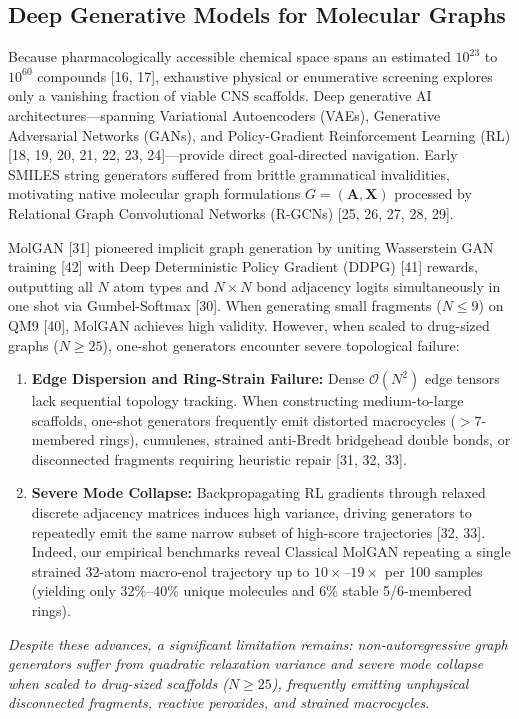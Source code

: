 \documentclass[10pt,a4paper]{article}
\begin{document}
\subsection{Deep Generative Models for Molecular Graphs}
Because pharmacologically accessible chemical space spans an estimated $10^{23}$ to $10^{60}$ compounds [16, 17], exhaustive physical or enumerative screening explores only a vanishing fraction of viable CNS scaffolds. Deep generative AI architectures---spanning Variational Autoencoders (VAEs), Generative Adversarial Networks (GANs), and Policy-Gradient Reinforcement Learning (RL) [18, 19, 20, 21, 22, 23, 24]---provide direct goal-directed navigation. Early SMILES string generators suffered from brittle grammatical invalidities, motivating native molecular graph formulations $G = (\mathbf{A}, \mathbf{X})$ processed by Relational Graph Convolutional Networks (R-GCNs) [25, 26, 27, 28, 29].

MolGAN [31] pioneered implicit graph generation by uniting Wasserstein GAN training [42] with Deep Deterministic Policy Gradient (DDPG) [41] rewards, outputting all $N$ atom types and $N \times N$ bond adjacency logits simultaneously in one shot via Gumbel-Softmax [30]. When generating small fragments ($N \le 9$) on QM9 [40], MolGAN achieves high validity. However, when scaled to drug-sized graphs ($N \ge 25$), one-shot generators encounter severe topological failure:
\begin{enumerate}[noitemsep]
    \item \textbf{Edge Dispersion and Ring-Strain Failure:} Dense $\mathcal{O}(N^2)$ edge tensors lack sequential topology tracking. When constructing medium-to-large scaffolds, one-shot generators frequently emit distorted macrocycles ($>7$-membered rings), cumulenes, strained anti-Bredt bridgehead double bonds, or disconnected fragments requiring heuristic repair [31, 32, 33].
    \item \textbf{Severe Mode Collapse:} Backpropagating RL gradients through relaxed discrete adjacency matrices induces high variance, driving generators to repeatedly emit the same narrow subset of high-score trajectories [32, 33]. Indeed, our empirical benchmarks reveal Classical MolGAN repeating a single strained 32-atom macro-enol trajectory up to $10\times$--$19\times$ per 100 samples (yielding only 32\%--40\% unique molecules and 6\% stable 5/6-membered rings).
\end{enumerate}
\textit{Despite these advances, a significant limitation remains: non-autoregressive graph generators suffer from quadratic relaxation variance and severe mode collapse when scaled to drug-sized scaffolds ($N \ge 25$), frequently emitting unphysical disconnected fragments, reactive peroxides, and strained macrocycles.}
\end{document}
